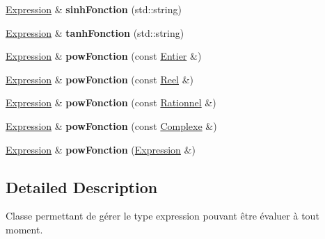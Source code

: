 \begin{DoxyCompactItemize}
\item 
\hypertarget{class_expression_a6eae473ce30bd7f1b03961be4a1c1103}{\hyperlink{class_expression}{Expression} \& {\bfseries sinh\-Fonction} (std\-::string)}\label{class_expression_a6eae473ce30bd7f1b03961be4a1c1103}

\item 
\hypertarget{class_expression_a92f8d74008d1cb0d44bd705463a7416a}{\hyperlink{class_expression}{Expression} \& {\bfseries tanh\-Fonction} (std\-::string)}\label{class_expression_a92f8d74008d1cb0d44bd705463a7416a}

\item 
\hypertarget{class_expression_affde75e11b8700af3abcd47007a508fa}{\hyperlink{class_expression}{Expression} \& {\bfseries pow\-Fonction} (const \hyperlink{class_entier}{Entier} \&)}\label{class_expression_affde75e11b8700af3abcd47007a508fa}

\item 
\hypertarget{class_expression_a2fb3923dfcc37b04343ceb1007d24d6b}{\hyperlink{class_expression}{Expression} \& {\bfseries pow\-Fonction} (const \hyperlink{class_reel}{Reel} \&)}\label{class_expression_a2fb3923dfcc37b04343ceb1007d24d6b}

\item 
\hypertarget{class_expression_a0e76639cff34bad17689d4a5107dc176}{\hyperlink{class_expression}{Expression} \& {\bfseries pow\-Fonction} (const \hyperlink{class_rationnel}{Rationnel} \&)}\label{class_expression_a0e76639cff34bad17689d4a5107dc176}

\item 
\hypertarget{class_expression_a48839cd4843fe09e95c2dc4dff18106e}{\hyperlink{class_expression}{Expression} \& {\bfseries pow\-Fonction} (const \hyperlink{class_complexe}{Complexe} \&)}\label{class_expression_a48839cd4843fe09e95c2dc4dff18106e}

\item 
\hypertarget{class_expression_aea48c6f6091bf8b2b99a1845419bc0dc}{\hyperlink{class_expression}{Expression} \& {\bfseries pow\-Fonction} (\hyperlink{class_expression}{Expression} \&)}\label{class_expression_aea48c6f6091bf8b2b99a1845419bc0dc}

\end{DoxyCompactItemize}


\subsection{Detailed Description}
Classe permettant de gérer le type expression pouvant être évaluer à tout moment. 

